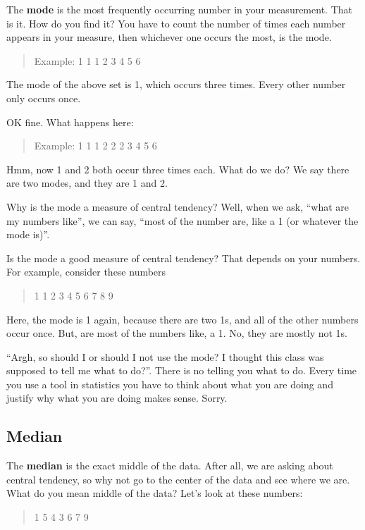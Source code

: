 \documentclass[
]{book}
\begin{document}
The \textbf{mode} is the most frequently occurring number in your measurement. That is it. How do you find it? You have to count the number of times each number appears in your measure, then whichever one occurs the most, is the mode.

\begin{quote}
Example: 1 1 1 2 3 4 5 6
\end{quote}

The mode of the above set is 1, which occurs three times. Every other number only occurs once.

OK fine. What happens here:

\begin{quote}
Example: 1 1 1 2 2 2 3 4 5 6
\end{quote}

Hmm, now 1 and 2 both occur three times each. What do we do? We say there are two modes, and they are 1 and 2.

Why is the mode a measure of central tendency? Well, when we ask, ``what are my numbers like'', we can say, ``most of the number are, like a 1 (or whatever the mode is)''.

Is the mode a good measure of central tendency? That depends on your numbers. For example, consider these numbers

\begin{quote}
1 1 2 3 4 5 6 7 8 9
\end{quote}

Here, the mode is 1 again, because there are two 1s, and all of the other numbers occur once. But, are most of the numbers like, a 1. No, they are mostly not 1s.

``Argh, so should I or should I not use the mode? I thought this class was supposed to tell me what to do?''. There is no telling you what to do. Every time you use a tool in statistics you have to think about what you are doing and justify why what you are doing makes sense. Sorry.

\hypertarget{median}{%
\subsection{Median}\label{median}}

The \textbf{median} is the exact middle of the data. After all, we are asking about central tendency, so why not go to the center of the data and see where we are. What do you mean middle of the data? Let's look at these numbers:

\begin{quote}
1 5 4 3 6 7 9
\end{quote}
\end{document}
